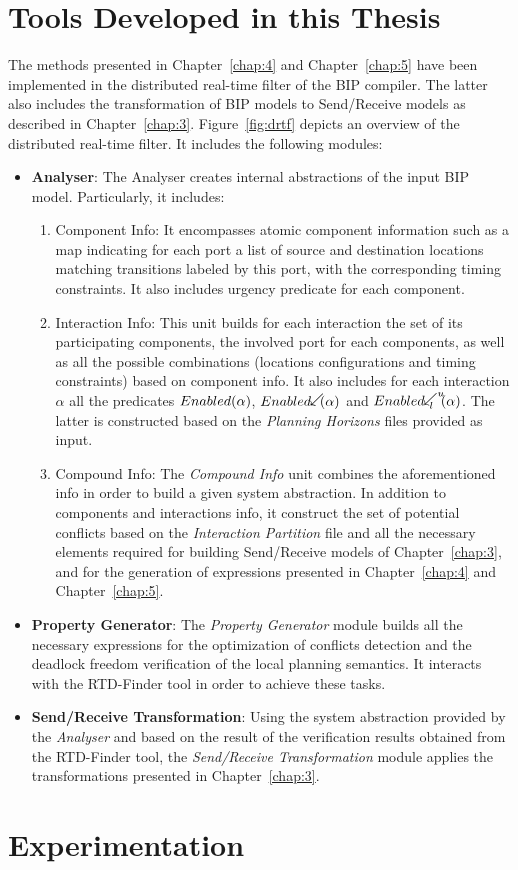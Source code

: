 \section{Tools Developed in this Thesis}
The methods presented in Chapter~\ref{chap:4} and Chapter~\ref{chap:5} have been implemented 
in the distributed real-time filter of the BIP compiler. The latter also includes
the transformation of BIP models to Send/Receive models as described in Chapter~\ref{chap:3}.
Figure~\ref{fig:drtf} depicts an overview of the distributed real-time filter. It includes the
following modules: 
\begin{itemize}
  \item \textbf{Analyser}: The Analyser creates internal abstractions of the input BIP
    model. Particularly, it includes:
    \begin{enumerate}
      \item Component Info: It encompasses atomic component information such as a map
        indicating for each port a list of source and destination locations matching transitions
        labeled by this port, with the corresponding timing constraints. 
        It also includes urgency predicate for each component.
      \item Interaction Info: This unit builds for each interaction the set of its participating
        components, the involved port for each components, as well as all the possible 
        combinations (locations configurations and timing constraints) based on component info.
        It also includes for each interaction $\alpha$ all the predicates $Enabled(\alpha)$,
        $\enabledbackward{\alpha}$ and $\enabledbackwardb{\alpha}{l}{u}$. The latter is 
        constructed based on the \emph{Planning Horizons} files provided as input.
      \item Compound Info: The \emph{Compound Info} unit combines the aforementioned info in
        order to build a given system abstraction. In addition to components and interactions 
        info, it construct the set of potential conflicts based on the \emph{Interaction 
        Partition} file and all the necessary elements required for building Send/Receive
        models of Chapter~\ref{chap:3}, and for the generation of expressions presented in 
        Chapter~\ref{chap:4} and Chapter~\ref{chap:5}. 
    \end{enumerate}
  \item \textbf{Property Generator}: The \emph{Property Generator} module builds all the 
    necessary expressions for the optimization of conflicts detection and the deadlock freedom
    verification of the local planning semantics.
    It interacts with the RTD-Finder tool in order to achieve these tasks. 
  \item \textbf{Send/Receive Transformation}: Using the system abstraction provided by 
    the \emph{Analyser} and based on the result of the verification results obtained
    from the RTD-Finder tool, the \emph{Send/Receive Transformation} module applies the 
    transformations presented in Chapter~\ref{chap:3}. 
\end{itemize}


\section{Experimentation}
